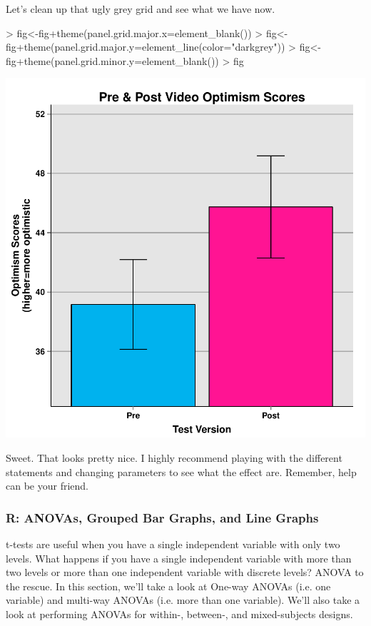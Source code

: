 \documentclass[12pt]{article}
\begin{document}
Let's clean up that ugly grey grid and see what we have now.
\begin{Schunk}
\begin{Sinput}
> fig<-fig+theme(panel.grid.major.x=element_blank())
> fig<-fig+theme(panel.grid.major.y=element_line(color="darkgrey"))
> fig<-fig+theme(panel.grid.minor.y=element_blank())
> fig
\end{Sinput}
\end{Schunk}
\includegraphics{Reproducibility-055}

Sweet. That looks pretty nice. I highly recommend playing with the different
statements and changing parameters to see what the effect are. Remember, help
can be your friend.

\subsubsection{R: ANOVAs, Grouped Bar Graphs, and Line Graphs}
t-tests are useful when you have a single independent variable with only two
levels. What happens if you have a single independent variable with more
than two levels or more than one independent variable with discrete levels?
ANOVA to the rescue. In this section, we'll take a look at One-way ANOVAs (i.e.
one variable) and multi-way ANOVAs (i.e. more than one variable). We'll
also take a look at performing ANOVAs for within-, between-, and mixed-subjects
designs.
\end{document}

